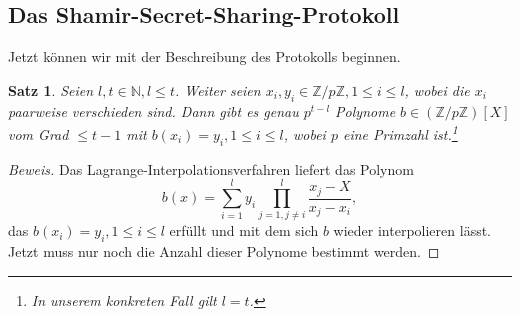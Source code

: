 \documentclass[12pt, a4paper, oneside, titlepage]{report}
\newcommand{\Z}{\mathds{Z}}
\newcommand{\N}{\mathds{N}}
\newtheorem{satz}[lemma]{Satz}
\newenvironment{bew}{\begin{proof}[Beweis]}{\end{proof}}
\theoremstyle{definition}
\begin{document}
	\subsection{Das Shamir-Secret-Sharing-Protokoll}
	Jetzt können wir mit der Beschreibung des Protokolls beginnen.
	
	\begin{satz}
		Seien $ l, t \in \N, l \leq t $. Weiter seien $ x_i, y_i \in \Z / p\Z, 1 \leq i \leq l $, wobei die $ x_i $ paarweise verschieden sind. Dann gibt es genau $ p^{t-l} $ Polynome $ b \in (\Z / p\Z)[X] $ vom Grad $ \leq t - 1 $ mit $ b(x_i) = y_i, 1 \leq i \leq l $, wobei $ p $ eine Primzahl ist.\footnote{In unserem konkreten Fall gilt $ l = t $.}
	\end{satz}

	\begin{bew}
		Das Lagrange-Interpolationsverfahren liefert das Polynom
		\begin{equation}\label{lagrange-polynom}
		b(x) = \sum_{i=1}^{l} y_i \prod_{j=1, j \neq i}^{l} \frac{x_j - X}{x_j - x_i},\end{equation} das $ b(x_i) = y_i, 1 \leq i \leq l $ erfüllt und mit dem sich $ b $ wieder interpolieren lässt. Jetzt muss nur noch die Anzahl dieser Polynome bestimmt werden.
		

\end{bew}
\end{document}
